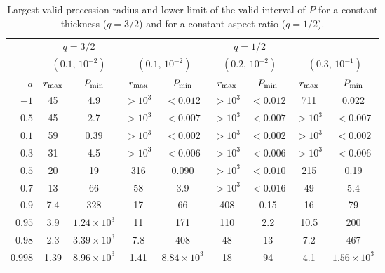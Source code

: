\begin{table}
\caption{Largest valid precession radius and lower limit of the valid interval of $P$ for a constant thickness ($q=3/2$) and for a constant aspect ratio ($q=1/2$).}
\label{tab:q}
\centering
\begin{tabular}{rcccccccc}
\hline\hline
 & \multicolumn{2}{c}{$q=3/2$} & \multicolumn{6}{c}{$q=1/2$} \\
 & \multicolumn{2}{c}{$(0.1,\,10^{-2})$} & \multicolumn{2}{c}{$(0.1,\,10^{-2})$} & \multicolumn{2}{c}{$(0.2,\,10^{-2})$} & \multicolumn{2}{c}{$(0.3,\,10^{-1})$} \\
$a$ & $r_\textup{max}$ & $P_\textup{min}$ & $r_\textup{max}$ & $P_\textup{min}$ & $r_\textup{max}$ & $P_\textup{min}$ & $r_\textup{max}$ & $P_\textup{min}$ \\
\hline
$-1$    & 45   & 4.9              & $>10^3$ & $<0.012$          & $>10^3$ & $<0.012$  & 711     & 0.022 \\
$-0.5$  & 45   & 2.7              & $>10^3$ & $<0.007$          & $>10^3$ & $<0.007$  & $>10^3$ & $<0.007$ \\
$0.1$   & 59   & 0.39             & $>10^3$ & $<0.002$          & $>10^3$ & $<0.002$  & $>10^3$ & $<0.002$ \\
$0.3$   & 31   & 4.5              & $>10^3$ & $<0.006$          & $>10^3$ & $<0.006$  & $>10^3$ & $<0.006$ \\
$0.5$   & 20   & 19               & 316     & 0.090             & $>10^3$ & $<0.010$  & 215     & 0.19 \\
$0.7$   & 13   & 66               & 58      & 3.9               & $>10^3$ & $<0.016$  & 49      & 5.4 \\
$0.9$   & 7.4  & 328              & 17      & 66                & 408     & 0.15      & 16      & 79 \\
$0.95$  & 3.9  & $1.24\times10^3$ & 11      & 171               & 110     & 2.2       & 10.5    & 200 \\
$0.98$  & 2.3  & $3.39\times10^3$ & 7.8     & 408               & 48      & 13        & 7.2     & 467 \\
$0.998$ & 1.39 & $8.96\times10^3$ & 1.41    & $8.84\times10^3$  & 18      & 94        & 4.1     & $1.56\times10^3$ \\
\hline
\end{tabular}
\end{table}

